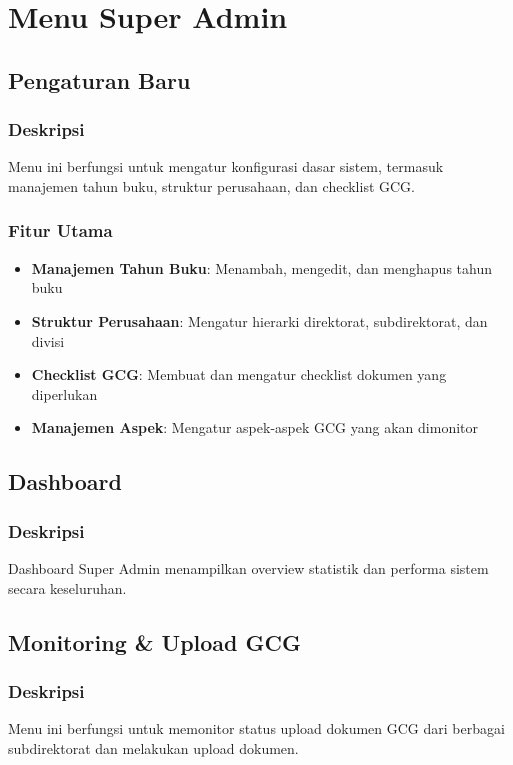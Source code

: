 \documentclass[12pt,a4paper]{article}
\begin{document}
\section{Menu Super Admin}
\subsection{Pengaturan Baru}
\subsubsection{Deskripsi}
Menu ini berfungsi untuk mengatur konfigurasi dasar sistem, termasuk manajemen tahun buku, struktur perusahaan, dan checklist GCG.

\subsubsection{Fitur Utama}
\begin{itemize}
\item \textbf{Manajemen Tahun Buku}: Menambah, mengedit, dan menghapus tahun buku
\item \textbf{Struktur Perusahaan}: Mengatur hierarki direktorat, subdirektorat, dan divisi
\item \textbf{Checklist GCG}: Membuat dan mengatur checklist dokumen yang diperlukan
\item \textbf{Manajemen Aspek}: Mengatur aspek-aspek GCG yang akan dimonitor
\end{itemize}

\subsection{Dashboard}
\subsubsection{Deskripsi}
Dashboard Super Admin menampilkan overview statistik dan performa sistem secara keseluruhan.

\subsection{Monitoring \& Upload GCG}
\subsubsection{Deskripsi}
Menu ini berfungsi untuk memonitor status upload dokumen GCG dari berbagai subdirektorat dan melakukan upload dokumen.
\end{document}

